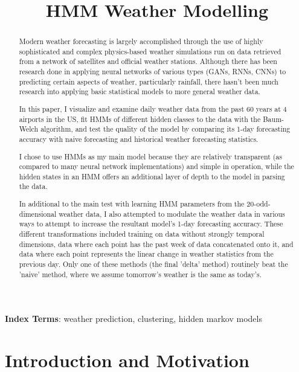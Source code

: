 \documentclass[a4paper]{article}
\title{HMM Weather Modelling}
\begin{document}
\maketitle
% 
\begin{abstract}

Modern weather forecasting is largely accomplished through the use of highly sophisticated and complex physics-based weather simulations run on data retrieved from a network of satellites and official weather stations. Although there has been research done in applying neural networks of various types (GANs, RNNs, CNNs) to predicting certain aspects of weather, particularly rainfall, there hasn't been much research into applying basic statistical models to more general weather data. 

In this paper, I visualize and examine daily weather data from the past 60 years at 4 airports in the US, fit HMMs of different hidden classes to the data with the Baum-Welch algorithm, and test the quality of the model by comparing its 1-day forecasting accuracy with naive forecasting and historical weather forecasting statistics. 

I chose to use HMMs as my main model because they are relatively transparent (as compared to many neural network implementations) and simple in operation, while the hidden states in an HMM offers an additional layer of depth to the model in parsing the data.

In additional to the main test with learning HMM parameters from the 20-odd-dimensional weather data, I also attempted to modulate the weather data in various ways to attempt to increase the resultant model's 1-day forecasting accuracy. These different transformations included training on data without strongly temporal dimensions, data where each point has the past week of data concatenated onto it, and data where each point represents the linear change in weather statistics from the previous day. Only one of these methods (the final 'delta' method) routinely beat the 'naive' method, where we assume tomorrow's weather is the same as today's.
\end{abstract}

\noindent\textbf{Index Terms}: weather prediction, clustering, hidden markov models




\section{Introduction and Motivation}
\end{document}
